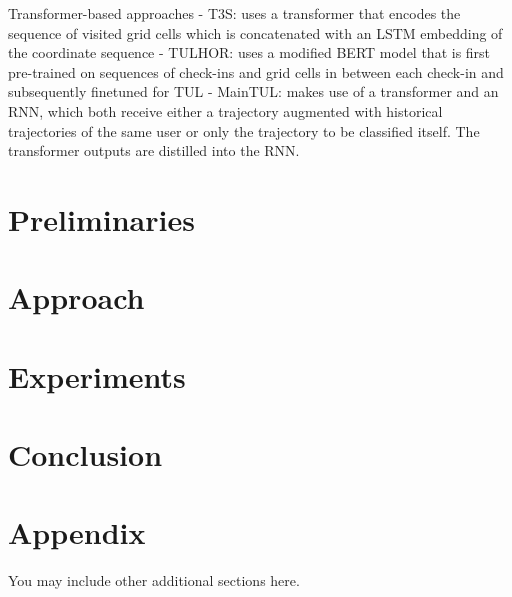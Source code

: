 \documentclass{article} %
\begin{document}
Transformer-based approaches
- T3S: uses a transformer that encodes the sequence of visited grid cells which is concatenated with an LSTM embedding of the coordinate sequence
- TULHOR: uses a modified BERT model that is first pre-trained on sequences of check-ins and grid cells in between each check-in and subsequently finetuned for TUL
- MainTUL: makes use of a transformer and an RNN, which both receive either a trajectory augmented with historical trajectories of the same user or only the trajectory to be classified itself. The transformer outputs are distilled into the RNN.



\section{Preliminaries}

\section{Approach}

\section{Experiments}

\section{Conclusion}






\appendix
\section{Appendix}
You may include other additional sections here.
\end{document}
